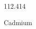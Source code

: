 \documentclass[12pt]{article}
\begin{document}
\hfill{}
\vfill
\begin{center}
  {\fontsize{50}{60}
  }

  \vspace{1em}

  112.414

Cadmium
\end{center}
\vfill
\end{document}
